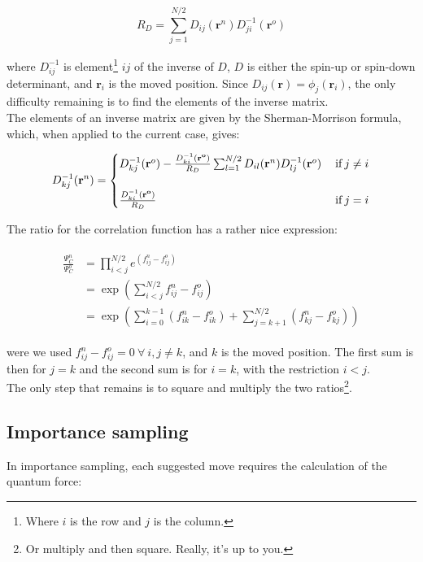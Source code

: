 \documentclass[english, a4paper]{article}
\newcommand{\bm}[1]{\mathbf{#1}}
\begin{document}
	\begin{equation}
	R_D = \sum_{j=1}^{N/2} D_{ij}(\bm{r}^n)D_{ji}^{-1}(\bm{r}^o)
	\end{equation}
	
	where $D_{ij}^{-1}$ is element\footnote{Where $i$ is the row and $j$ is the column.} $ij$ of the inverse of $D$, $D$ is either the spin-up or spin-down determinant, and $\bm{r}_i$ is the moved position. Since $D_{ij}(\bm{r}) = \phi_j(\bm{r}_i)$, the only difficulty remaining is to find the elements of the inverse matrix.\\
	
	The elements of an inverse matrix are given by the Sherman-Morrison formula, which, when applied to the current case, gives:
	
	\begin{equation}
	D_{kj}^{-1}(\bm{r}^n) =
	\begin{cases}
	D_{kj}^{-1}(\bm{r}^o) - \frac{D_{ki}^{-1}(\bm{r^o})}{R_D}\sum_{l=1}^{N/2}D_{il}(\bm{r}^n)D_{lj}^{-1}(\bm{r}^o) \:&\text{if}\: j\neq i\\ \vspace{1pt}\\
	\frac{D_{ki}^{-1}(\bm{r^o})}{R_D} \:&\text{if}\: j = i \\
	\end{cases}
	\label{eq:update_inverse_SD}
	\end{equation}
	
	The ratio for the correlation function has a rather nice expression:
	
	\begin{align}
	\begin{split}
	\frac{\Psi_C^n}{\Psi_C^o} &= \prod_{i<j}^{N/2} e^{(f_{ij}^n-f_{ij}^o)}\\
	&= \exp\left( \sum_{i<j}^{N/2} f_{ij}^n - f_{ij}^o \right)\\
	&= \exp\left(\sum_{i=0}^{k-1}(f_{ik}^n - f_{ik}^o) + \sum_{j=k+1}^{N/2}(f_{kj}^n - f_{kj}^o)\right)
	\end{split}
	\end{align}
	
	were we used $f_{ij}^n-f_{ij}^o=0\:\forall\:i,j\neq k$, and $k$ is the moved position. The first sum is then for $j=k$ and the second sum is for $i=k$, with the restriction $i<j$.\\
	The only step that remains is to square and multiply the two ratios\footnote{Or multiply and then square. Really, it's up to you.}.
	
	\subsection{Importance sampling}
	In importance sampling, each suggested move requires the calculation of the quantum force:
	
\end{document}
